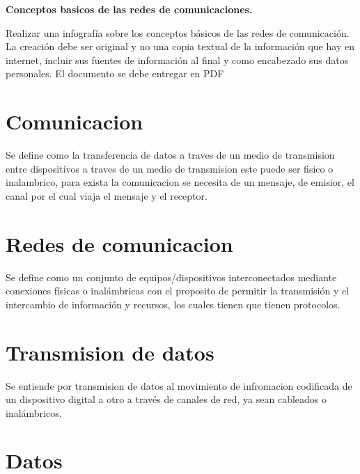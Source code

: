\documentclass[a4paper,12pt]{article}
\begin{document}
\renewcommand{\footrulewidth}{0.4pt}  %

\setcounter{page}{1}

\tableofcontents

\newpage

\textbf{Conceptos basicos de las redes de comunicaciones.}

Realizar una infografía sobre los conceptos básicos de las redes de comunicación. La creación debe ser original y no una copia textual de la información que hay en internet, incluir sus fuentes de información al final y como encabezado sus datos personales. El documento se debe entregar en PDF

\section{Comunicacion}
Se define como la transferencia de datos a traves de un medio de transmision entre dispositivos a traves de un medio de transmision este puede ser fisico o inalambrico, para exista la comunicacion se necesita de un mensaje, de emisior, el canal por el cual viaja el mensaje y el receptor.

\section{Redes de comunicacion}

Se define como un conjunto de equipos/dispositivos interconectados mediante conexiones físicas o inalámbricas con el proposito de permitir la transmisión y el intercambio de información y recursos, los cuales tienen que tienen protocolos.


\section{Transmision de datos}

Se entiende por transmision de datos al movimiento de infromacion codificada de un dispositivo digital a otro a través de canales de red, ya sean cableados o inalámbricos.
 
\section{Datos}
\end{document}

